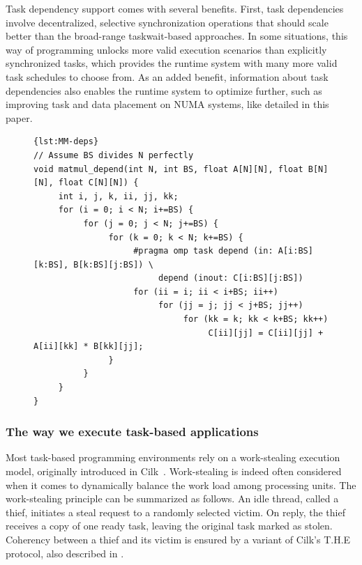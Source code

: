 \documentclass{Styles/llncs}
\begin{document}
Task dependency support comes with several benefits. 
First, task dependencies involve decentralized, selective synchronization operations that should scale better than the broad-range taskwait-based approaches.
In some situations, this way of programming unlocks more valid execution scenarios than explicitly synchronized tasks, which provides the runtime system with many more valid task schedules to choose from. 
As an added benefit, information about task dependencies also enables the runtime system to optimize further, such as improving task and data placement on NUMA systems, like detailed in this paper.

\vspace{-0.5cm}

\begin{figure}[htbp]
\begin{lstlisting}[caption=Blocked matrix multiplication with OpenMP task dependencies,frame=tlrb,style=smaller,label=lst:MM-deps]{lst:MM-deps}
// Assume BS divides N perfectly
void matmul_depend(int N, int BS, float A[N][N], float B[N][N], float C[N][N]) {
     int i, j, k, ii, jj, kk;
     for (i = 0; i < N; i+=BS) {
          for (j = 0; j < N; j+=BS) {
               for (k = 0; k < N; k+=BS) {
                    #pragma omp task depend (in: A[i:BS][k:BS], B[k:BS][j:BS]) \
                         depend (inout: C[i:BS][j:BS])
                    for (ii = i; ii < i+BS; ii++)
                         for (jj = j; jj < j+BS; jj++)
                              for (kk = k; kk < k+BS; kk++)
                                   C[ii][jj] = C[ii][jj] + A[ii][kk] * B[kk][jj];
               }
          }
     }
}
\end{lstlisting}
\end{figure}

\vspace{-1cm}

\subsubsection{The way we execute task-based applications}

Most task-based programming environments rely on a work-stealing execution model, originally introduced in Cilk~\cite{cilk5}. 
Work-stealing is indeed often considered when it comes to dynamically balance the work load among processing units. 
The work-stealing principle can be summarized as follows. 
An idle thread, called a thief, initiates a steal request to a randomly selected victim. 
On reply, the thief receives a copy of one ready task, leaving the original task marked as stolen.
Coherency between a thief and its victim is ensured by a variant of Cilk's T.H.E protocol, also described in \cite{cilk5}.
\end{document}
